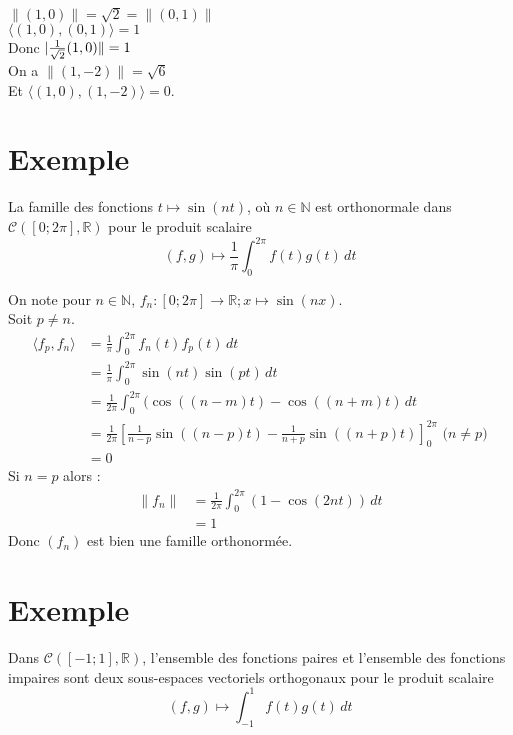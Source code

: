 \documentclass[../main.tex]{subfiles}
\begin{document}
\noindent $\| (1, 0)\| = \sqrt{2} = \| (0, 1)\|$ \\
$\langle (1, 0), (0, 1)\rangle = 1$ \\
Donc $\\| \frac{1}{\sqrt{2}}(1, 0)\| = 1$ \\
On a $\| (1, -2)\| = \sqrt{6}$ \\
Et $\langle (1, 0), (1, -2)\rangle = 0$. 

\section{Exemple}
\begin{tcolorbox}[title=Exemple 34.23, title filled=false, colframe=darkgreen, colback=darkgreen!10!white]
    La famille des fonctions $t \mapsto \sin (n t)$, où $n \in \mathbb{N}$ est orthonormale dans $\mathcal{C}([0 ; 2 \pi], \mathbb{R})$ pour le produit scalaire
    $$(f, g) \mapsto \frac{1}{\pi} \int_0^{2 \pi} f(t) g(t) \,dt$$
\end{tcolorbox}

\noindent On note pour $n\in \mathbb{N}$, $f_n: [0 ; 2\pi] \to \mathbb{R};x\mapsto \sin(nx)$. \\
Soit $p\neq n$. \\
\begin{align*}
    \langle f_p, f_n \rangle &= \frac{1}{\pi} \int_{0}^{2\pi} f_n(t) f_p(t) \,dt \\
    &= \frac{1}{\pi} \int_{0}^{2\pi} \sin(nt) \sin(pt) \,dt \\
    &= \frac{1}{2\pi} \int_{0}^{2\pi} (\cos((n-m)t) - \cos((n+m)t) \,dt \\
    &= \frac{1}{2\pi} \left[ \frac{1}{n-p} \sin((n-p)t) - \frac{1}{n+p}\sin((n+p)t) \right]^{2\pi}_0 \text{ ($n\neq p$)} \\
    &= 0
\end{align*}
Si $n = p$ alors : 
\begin{align*}
    \|f_n\| &= \frac{1}{2\pi} \int_{0}^{2\pi} (1 - \cos(2nt)) \,dt \\
    &= 1
\end{align*}
Donc $(f_n)$ est bien une famille orthonormée. 

\section{Exemple}
\begin{tcolorbox}[title=Exemple 34.24, title filled=false, colframe=darkgreen, colback=darkgreen!10!white]
    Dans $\mathcal{C}([-1 ; 1], \mathbb{R})$, l'ensemble des fonctions paires et l'ensemble des fonctions impaires sont deux sous-espaces vectoriels orthogonaux pour le produit scalaire
    $$(f, g) \mapsto \int_{-1}^1 f(t) g(t) \,dt$$
\end{tcolorbox}
\end{document}
